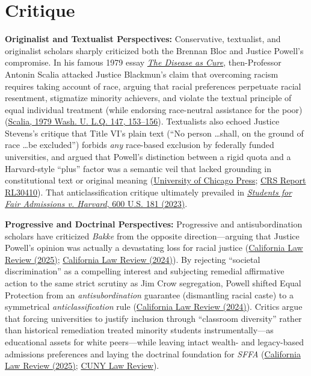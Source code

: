 \documentclass[12pt]{article}
\begin{document}
\section{Critique}
\textbf{Originalist and Textualist Perspectives:} Conservative, textualist, and originalist scholars sharply criticized both the Brennan Bloc and Justice Powell's compromise. In his famous 1979 essay \href{https://chicagounbound.uchicago.edu/cgi/viewcontent.cgi?article=11890&context=journal_articles}{\textit{The Disease as Cure}}, then-Professor Antonin Scalia attacked Justice Blackmun's claim that overcoming racism requires taking account of race, arguing that racial preferences perpetuate racial resentment, stigmatize minority achievers, and violate the textual principle of equal individual treatment (while endorsing race-neutral assistance for the poor) (\href{https://chicagounbound.uchicago.edu/cgi/viewcontent.cgi?article=11890&context=journal_articles}{Scalia, 1979 Wash. U. L.Q. 147, 153--156}). Textualists also echoed Justice Stevens's critique that Title VI's plain text (``No person \ldots shall, on the ground of race \ldots be excluded'') forbids \textit{any} race-based exclusion by federally funded universities, and argued that Powell's distinction between a rigid quota and a Harvard-style ``plus'' factor was a semantic veil that lacked grounding in constitutional text or original meaning (\href{https://www.journals.uchicago.edu/doi/full/10.1086/730860}{University of Chicago Press}; \href{https://www.everycrsreport.com/reports/RL30410.html}{CRS Report RL30410}). That anticlassification critique ultimately prevailed in \href{https://en.wikipedia.org/wiki/Students_for_Fair_Admissions_v._Harvard}{\textit{Students for Fair Admissions v. Harvard}, 600 U.S. 181 (2023)}.

\textbf{Progressive and Doctrinal Perspectives:} Progressive and antisubordination scholars have criticized \textit{Bakke} from the opposite direction---arguing that Justice Powell's opinion was actually a devastating loss for racial justice (\href{https://www.californialawreview.org/print/sffa-bakke}{California Law Review (2025)}; \href{https://www.californialawreview.org/print/antisubordination-eighth}{California Law Review (2024)}). By rejecting ``societal discrimination'' as a compelling interest and subjecting remedial affirmative action to the same strict scrutiny as Jim Crow segregation, Powell shifted Equal Protection from an \textit{antisubordination} guarantee (dismantling racial caste) to a symmetrical \textit{anticlassification} rule (\href{https://www.californialawreview.org/print/antisubordination-eighth}{California Law Review (2024)}). Critics argue that forcing universities to justify inclusion through ``classroom diversity'' rather than historical remediation treated minority students instrumentally---as educational assets for white peers---while leaving intact wealth- and legacy-based admissions preferences and laying the doctrinal foundation for \textit{SFFA} (\href{https://www.californialawreview.org/print/sffa-bakke}{California Law Review (2025)}; \href{https://academicworks.cuny.edu/cgi/viewcontent.cgi?article=1606&context=clr}{CUNY Law Review}).
\end{document}
